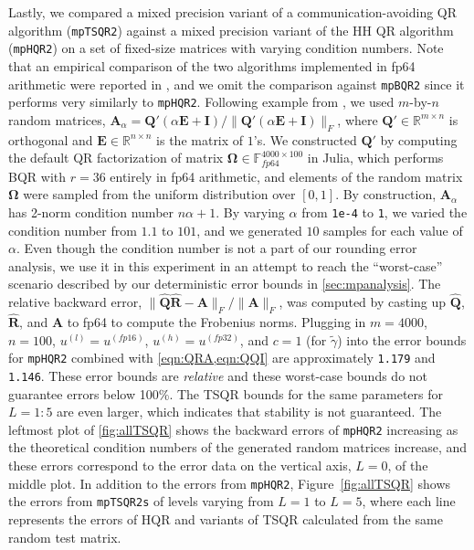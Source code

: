 \documentclass[review,onefignum,onetabnum]{siamart190516}
\newcommand{\R}{\mathbb{R}}
\newcommand{\F}{\mathbb{F}}
\newcommand{\bb}[1]{\mathbf{#1}}
\begin{document}
Lastly, we compared a mixed precision variant of a communication-avoiding QR algorithm ({\tt mpTSQR2}) against a mixed precision variant of the HH QR algorithm ({\tt mpHQR2}) on a set of fixed-size matrices with varying condition numbers.
Note that an empirical comparison of the two algorithms implemented in fp64 arithmetic were reported in \cite{Mori2012}, and we omit the comparison against {\tt mpBQR2} since it performs very similarly to {\tt mpHQR2}.
Following example from \cite{Mori2012}, we used $m$-by-$n$ random matrices, $\bb{A}_{\alpha} = \bb{Q'}(\alpha \bb{E} + \bb{I})/\|\bb{Q'}(\alpha \bb{E} + \bb{I})\|_F$, where $\bb{Q'}\in\mathbb{R}^{m\times n}$ is orthogonal and $\bb{E}\in\R^{n\times n}$ is the matrix of $1$'s. 
We constructed $\bb{Q'}$ by computing the default QR factorization of matrix $\bb{\Omega}\in\F_{fp64}^{4000\times100}$ in Julia, which performs BQR with $r=36$ entirely in fp64 arithmetic, and elements of the random matrix $\bb{\Omega}$ were sampled from the uniform distribution over $[0,1]$.
By construction, $\bb{A}_{\alpha}$ has 2-norm condition number $n\alpha+1$. 
By varying $\alpha$ from {\tt 1e-4} to {\tt 1}, we varied the condition number from $1.1$ to $101$, and we generated $10$ samples for each value of $\alpha$.
Even though the condition number is not a part of our rounding error analysis, we use it in this experiment in an attempt to reach the ``worst-case'' scenario described by our deterministic error bounds in \cref{sec:mpanalysis}.
The relative backward error, $\|\hat{\bb{Q}}\hat{\bb{R}}-\bb{A}\|_F/\|\bb{A}\|_F$, was computed by casting up $\hat{\bb{Q}}$, $\hat{\bb{R}}$, and $\bb{A}$ to fp64 to compute the Frobenius norms.
Plugging in $m=4000$, $n=100$, $u^{(l)}=u^{(fp16)}$, $u^{(h)}=u^{(fp32)}$, and $c=1$ (for $\tilde{\gamma}$) into the error bounds for {\tt mpHQR2} combined with \cref{eqn:QRA,eqn:QQI} are approximately {\tt 1.179} and {\tt 1.146}.
These error bounds are \emph{relative} and these worst-case bounds do not guarantee errors below 100\%.
The TSQR bounds for the same parameters for $L=1:5$ are even larger, which indicates that stability is not guaranteed. 
The leftmost plot of \cref{fig:allTSQR} shows the backward errors of {\tt mpHQR2} increasing as the theoretical condition numbers of the generated random matrices increase, and these errors correspond to the error data on the vertical axis, $L=0$, of the middle plot.
In addition to the errors from {\tt mpHQR2}, Figure~\ref{fig:allTSQR} shows the errors from {\tt mpTSQR2s} of levels varying from $L=1$ to $L=5$, where each line represents the errors of HQR and variants of TSQR calculated from the same random test matrix.
\end{document}
